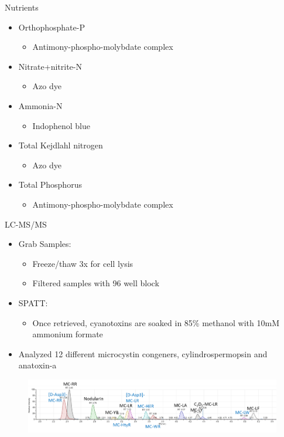 \begin{frame}{Nutrients}
	\begin{itemize}
		\item Orthophosphate-P 
			\begin{itemize}
				\item Antimony-phospho-molybdate complex
			\end{itemize}
		\item Nitrate+nitrite-N 
			\begin{itemize}
				\item Azo dye
			\end{itemize}
		\item Ammonia-N 
			\begin{itemize}
				\item Indophenol blue
			\end{itemize}
		\item Total Kejdlahl nitrogen 
			\begin{itemize}
				\item Azo dye
			\end{itemize}
		\item Total Phosphorus
			\begin{itemize}
				\item Antimony-phospho-molybdate complex
			\end{itemize}
	\end{itemize}

	

\end{frame}

\begin{frame}{LC-MS/MS}
	\begin{itemize}
		\item Grab Samples: 
		\begin{itemize}
			\item Freeze/thaw 3x for cell lysis 
			\item Filtered samples with 96 well block 
		\end{itemize}
		\item SPATT: 
		\begin{itemize}
			\item Once retrieved, cyanotoxins are soaked in 85\% methanol with 10mM ammonium formate
		\end{itemize}
		\item Analyzed 12 different microcystin congeners, cylindrospermopsin and anatoxin-a
	\end{itemize}
	\begin{figure}
		\includegraphics[width=\textwidth]{../figures/LCMS_CONGENERS.png}
	\end{figure}
\end{frame}

